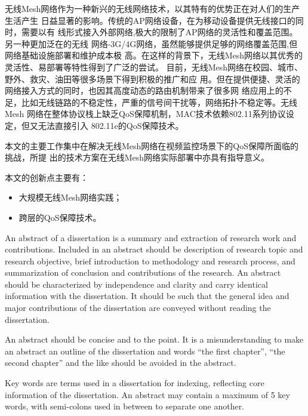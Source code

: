 \begin{cabstract}
  无线Mesh网络作为一种新兴的无线网络技术，以其特有的优势正在对人们的生产生活产生
  日益显著的影响。传统的AP网络设备，在为移动设备提供无线接口的同时，需要以有
  线形式接入外部网络,极大的限制了AP网络的灵活性和覆盖范围。另一种更加泛在的无线
  网络-3G/4G网络，虽然能够提供足够的网络覆盖范围,但网络基础设施部署和维护成本极
  高。在这样的背景下，无线Mesh网络以其优秀的灵活性、易部署等特性得到了广泛的尝试。
  目前，无线Mesh网络在校园、城市、野外、救灾、油田等很多场景下得到积极的推广和应
  用。但在提供便捷、灵活的网络接入方式的同时，也因其高度动态的路由机制带来了很多网
  络应用上的不足，比如无线链路的不稳定性，严重的信号间干扰等，网络拓扑不稳定等。无线Mesh
  网络在整体协议栈上缺乏QoS保障机制，MAC技术依赖802.11系列协议设定，但又无法直接引入
  802.11e的QoS保障技术。

  本文的主要工作集中在解决无线Mesh网络在视频监控场景下的QoS保障所面临的挑战，所提
  出的技术方案在无线Mesh网络实际部署中亦具有指导意义。

  本文的创新点主要有：
  \begin{itemize}
    \item 大规模无线Mesh网络实践；
    \item 跨层的QoS保障技术。
  \end{itemize}

\end{cabstract}


\begin{eabstract}
   An abstract of a dissertation is a summary and extraction of research work
   and contributions. Included in an abstract should be description of research
   topic and research objective, brief introduction to methodology and research
   process, and summarization of conclusion and contributions of the
   research. An abstract should be characterized by independence and clarity and
   carry identical information with the dissertation. It should be such that the
   general idea and major contributions of the dissertation are conveyed without
   reading the dissertation.

   An abstract should be concise and to the point. It is a misunderstanding to
   make an abstract an outline of the dissertation and words ``the first
   chapter'', ``the second chapter'' and the like should be avoided in the
   abstract.

   Key words are terms used in a dissertation for indexing, reflecting core
   information of the dissertation. An abstract may contain a maximum of 5 key
   words, with semi-colons used in between to separate one another.
\end{eabstract}

